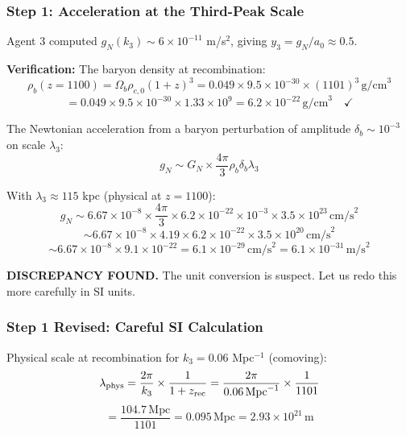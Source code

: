 \documentclass[11pt,a4paper]{article}
\begin{document}
\subsubsection{Step 1: Acceleration at the Third-Peak Scale}

Agent 3 computed $g_N(k_3) \sim 6 \times 10^{-11}$ m/s$^2$, giving $y_3 = g_N/a_0 \approx 0.5$.

\textbf{Verification:} The baryon density at recombination:
\begin{equation}
\rho_b(z=1100) = \Omega_b \rho_{c,0}(1+z)^3 = 0.049 \times 9.5\times10^{-30} \times (1101)^3\,\text{g/cm}^3
\end{equation}
\begin{equation}
= 0.049 \times 9.5\times10^{-30} \times 1.33\times10^{9} = 6.2\times10^{-22}\,\text{g/cm}^3 \quad \checkmark
\end{equation}

The Newtonian acceleration from a baryon perturbation of amplitude $\delta_b \sim 10^{-3}$ on scale $\lambda_3$:
\begin{equation}
g_N \sim G_N \times \frac{4\pi}{3}\rho_b \delta_b \lambda_3
\end{equation}

With $\lambda_3 \approx 115$ kpc (physical at $z = 1100$):
\begin{equation}
g_N \sim 6.67\times10^{-8} \times \frac{4\pi}{3} \times 6.2\times10^{-22} \times 10^{-3} \times 3.5\times10^{23}\,\text{cm/s}^2
\end{equation}
\begin{equation}
\sim 6.67\times10^{-8} \times 4.19 \times 6.2\times10^{-22} \times 3.5\times10^{20}\,\text{cm/s}^2
\end{equation}
\begin{equation}
\sim 6.67\times10^{-8} \times 9.1\times10^{-22} = 6.1\times10^{-29}\,\text{cm/s}^2 = 6.1\times10^{-31}\,\text{m/s}^2
\end{equation}

\textbf{DISCREPANCY FOUND.} The unit conversion is suspect. Let us redo this more carefully in SI units.

\subsubsection{Step 1 Revised: Careful SI Calculation}

Physical scale at recombination for $k_3 = 0.06$ Mpc$^{-1}$ (comoving):
\begin{equation}
\lambda_{\rm phys} = \frac{2\pi}{k_3} \times \frac{1}{1+z_{\rm rec}} = \frac{2\pi}{0.06\,\text{Mpc}^{-1}} \times \frac{1}{1101}
\end{equation}
\begin{equation}
= \frac{104.7\,\text{Mpc}}{1101} = 0.095\,\text{Mpc} = 2.93\times10^{21}\,\text{m}
\end{equation}
\end{document}
